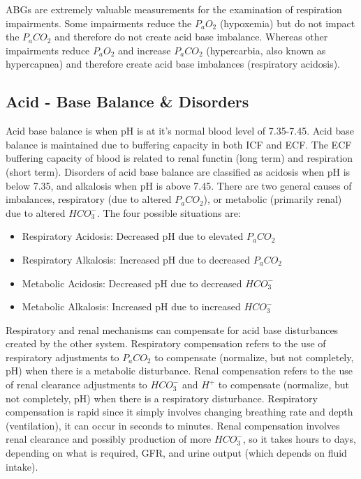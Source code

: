 ABGs are extremely valuable measurements for the examination of respiration impairments. Some impairments reduce the $P_aO_2$ (hypoxemia) but do not impact the $P_aCO_2$ and therefore do not create acid base imbalance. Whereas other impairments reduce $P_aO_2$ and increase $P_aCO_2$ (hypercarbia, also known as hypercapnea) and therefore create acid base imbalances (respiratory acidosis).

\subsection{Acid - Base Balance \& Disorders}

Acid base balance is when pH is at it's normal blood level of 7.35-7.45. Acid base balance is maintained due to buffering capacity in both ICF and ECF. The ECF buffering capacity of blood is related to renal functin (long term) and respiration (short term). Disorders of acid base balance are classified as acidosis when pH is below 7.35, and alkalosis when pH is above 7.45. There are two general causes of imbalances, respiratory (due to altered $P_aCO_2$), or metabolic (primarily renal) due to altered $HCO_3^-$. The four possible situations are:
\vspace{3mm}
\begin{itemize}
    \item Respiratory Acidosis: Decreased pH due to elevated $P_aCO_2$
    \item Respiratory Alkalosis: Increased pH due to decreased $P_aCO_2$
    \item Metabolic Acidosis: Decreased pH due to decreased $HCO_3^-$
    \item Metabolic Alkalosis: Increased pH due to increased $HCO_3^-$
\end{itemize}
\vspace{3mm}

Respiratory and renal mechanisms can compensate for acid base disturbances created by the other system. Respiratory compensation refers to the use of respiratory adjustments to $P_aCO_2$ to compensate (normalize, but not completely, pH) when there is a metabolic disturbance. Renal compensation refers to the use of renal clearance adjustments to $HCO_3^-$ and $H^+$ to compensate (normalize, but not completely, pH) when there is a respiratory disturbance. Respiratory compensation is rapid since it simply involves changing breathing rate and depth (ventilation), it can occur in seconds to minutes. Renal compensation involves renal clearance and possibly production of more $HCO_3^-$, so it takes hours to days, depending on what is required, GFR, and urine output (which depends on fluid intake).

